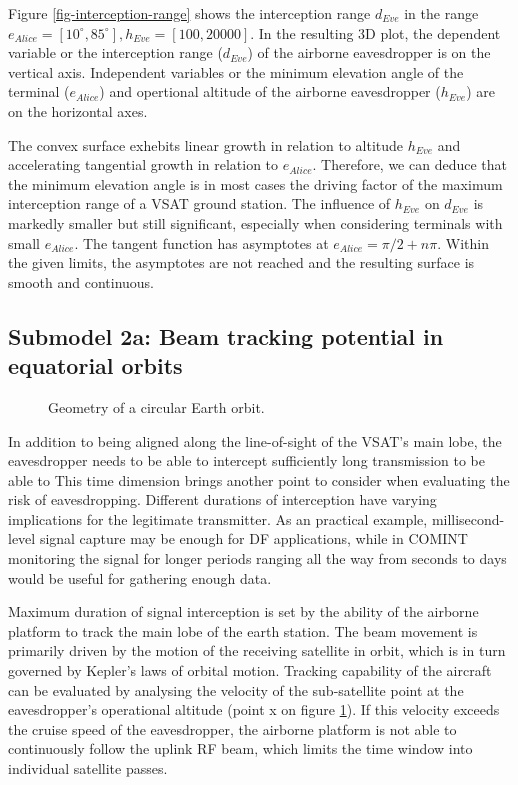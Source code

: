 \documentclass[english, 12pt, a4paper, elec, utf8, a-1b, online]{aaltothesis}
\begin{document}
Figure \ref{fig-interception-range} shows the interception range $d_{Eve}$ in the range $e_{Alice} = [10^\circ, 85^\circ], h_{Eve} = [100,20000]$.
In the resulting 3D plot, the dependent variable or the interception range ($d_{Eve}$) of the airborne eavesdropper is on the vertical axis.
Independent variables or the minimum elevation angle of the terminal ($e_{Alice}$) and opertional altitude of the airborne eavesdropper ($h_{Eve}$) are on the horizontal axes.

The convex surface exhebits linear growth in relation to altitude $h_{Eve}$ and accelerating tangential growth in relation to $e_{Alice}$.
Therefore, we can deduce that the minimum elevation angle is in most cases the driving factor of the maximum interception range of a VSAT ground station.
The influence of $h_{Eve}$ on $d_{Eve}$ is markedly smaller but still significant, especially when considering terminals with small $e_{Alice}$.
The tangent function has asymptotes at $e_{Alice} = \pi / 2 + n\pi$. Within the given limits, the asymptotes are not reached and the resulting surface is smooth and continuous.


\subsection{Submodel 2a: Beam tracking potential in equatorial orbits} \label{ch-results-submodel-2a-tracking-equatorial}

\begin{figure}[h]
  \centering
  
  \caption{Geometry of a circular Earth orbit.}
  \label{fig-orbit-geometry}
\end{figure}

In addition to being aligned along the line-of-sight of the VSAT's main lobe, the eavesdropper needs to be able to intercept sufficiently long transmission to be able to %
This time dimension brings another point to consider when evaluating the risk of eavesdropping.
Different durations of interception have varying implications for the legitimate transmitter.
As an practical example, millisecond-level signal capture may be enough for DF applications, while in COMINT monitoring the signal for longer periods ranging all the way from seconds to days would be useful for gathering enough data. %

Maximum duration of signal interception is set by the ability of the airborne platform to track the main lobe of the earth station.
The beam movement is primarily driven by the motion of the receiving satellite in orbit, which is in turn governed by Kepler's laws of orbital motion.
Tracking capability of the aircraft can be evaluated by analysing the velocity of the sub-satellite point at the eavesdropper's operational altitude (point x on figure \ref{fig-orbit-geometry}).
If this velocity exceeds the cruise speed of the eavesdropper, the airborne platform is not able to continuously follow the uplink RF beam, which limits the time window into individual satellite passes.
\end{document}
